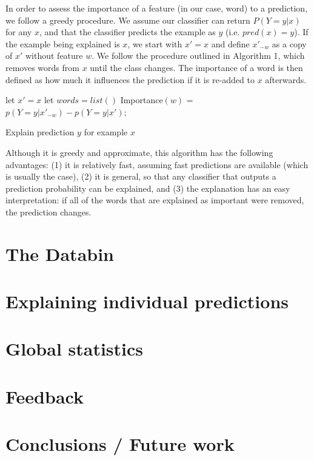 \documentclass{chi2009}
\begin{document}
In order to assess the importance of a feature (in our case, word) to a
prediction, we follow a greedy procedure. We assume our classifier can return
$P(Y=y|x)$ for any $x$, and that the classifier predicts the example as $y$
(i.e. $pred(x) = y$). If
the example being explained is $x$, we start with $x' = x$ and define $x'_{-w}$
as a copy of $x'$ without feature $w$. We follow the procedure outlined in
Algorithm 1, which removes words from $x$ until the class changes. The
importance of a word is then defined as how much it influences the prediction if
it is re-added to $x$ afterwards.

\begin{algorithm}
 let $x' = x$\;
 let $words = list()$\;
  {
  Importance$(w)$ = $p(Y=y | x'_{-w}) - p(Y=y | x')$;
 }
 \caption{Explain prediction $y$ for example $x$}
\end{algorithm}

Although it is greedy and approximate, this algorithm has the following
advantages: (1) it is relatively fast, assuming fast predictions are available
(which is usually the case), (2) it is general, so that any classifier that
outputs a prediction probability can be explained, and (3) the explanation has
an easy interpretation: if all of the words that are explained as important
were removed, the prediction changes.

\section{The Databin}
\section{Explaining individual predictions}
\section{Global statistics}
\section{Feedback}
\section{Conclusions / Future work}
\end{document}
